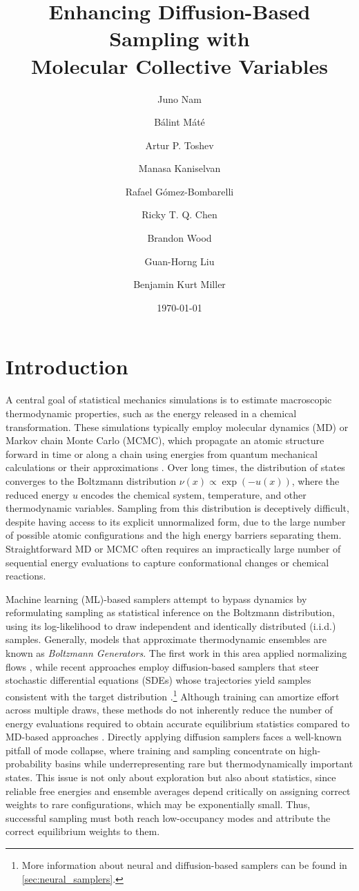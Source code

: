 \documentclass[]{fairmeta}
\title{Enhancing Diffusion-Based Sampling with \\ Molecular Collective Variables}
\author[1,2,\ast,\dagger]{Juno Nam}
\author[1,3,\dagger]{B\'alint M\'at\'e}
\author[1,4,\dagger]{Artur P. Toshev}
\author[1,5,\dagger]{Manasa Kaniselvan}
\author[2]{Rafael G\'omez-Bombarelli}
\author[1]{Ricky T. Q. Chen}
\author[1]{Brandon Wood}
\author[1,\ast]{Guan-Horng Liu}
\author[1,\ast]{Benjamin Kurt Miller}
\affiliation[1]{FAIR at Meta}
\affiliation[2]{MIT}
\affiliation[3]{University of Geneva}
\affiliation[4]{TUM}
\affiliation[5]{ETH Zurich}
\date{\today}
\theoremstyle{remark}
\begin{document}
\maketitle
 
\section{Introduction}

A central goal of statistical mechanics simulations is to estimate macroscopic thermodynamic properties, such as the energy released in a chemical transformation.
These simulations typically employ molecular dynamics (MD) or Markov chain Monte Carlo (MCMC), which propagate an atomic structure forward in time or along a chain using energies from quantum mechanical calculations or their approximations \citep{marx2000ab,frenkel2023understanding,jacobs2025practical}.
Over long times, the distribution of states converges to the Boltzmann distribution $\nu(x) \propto \exp(-u(x))$, where the reduced energy $u$ encodes the chemical system, temperature, and other thermodynamic variables.
Sampling from this distribution is deceptively difficult, despite having access to its explicit unnormalized form, due to the large number of possible atomic configurations and the high energy barriers separating them.
Straightforward MD or MCMC often requires an impractically large number of sequential energy evaluations to capture conformational changes or chemical reactions.

Machine learning (ML)-based samplers attempt to bypass dynamics by reformulating sampling as statistical inference on the Boltzmann distribution, using its log-likelihood to draw independent and identically distributed (i.i.d.\@) samples. Generally, models that approximate thermodynamic ensembles are known as \emph{Boltzmann Generators}. 
The first work in this area applied normalizing flows \citep{noe2019boltzmann}, while recent approaches employ diffusion-based samplers that steer stochastic differential equations (SDEs) whose trajectories yield samples consistent with the target distribution \citep{zhang2021path,vargas2023denoising,havens2025adjoint}.\footnote{More information about neural and diffusion-based samplers can be found in \cref{sec:neural_samplers}.}
Although training can amortize effort across multiple draws, these methods do not inherently reduce the number of energy evaluations required to obtain accurate equilibrium statistics compared to MD-based approaches \citep{he2025trick}.
Directly applying diffusion samplers faces a well-known pitfall of mode collapse, where training and sampling concentrate on high-probability basins while underrepresenting rare but thermodynamically important states.
This issue is not only about exploration but also about statistics, since reliable free energies and ensemble averages depend critically on assigning correct weights to rare configurations, which may be exponentially small.
Thus, successful sampling must both reach low-occupancy modes and attribute the correct equilibrium weights to them.
\end{document}
